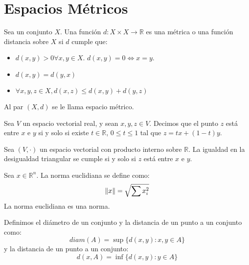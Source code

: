 \documentclass{./Topologia.tex}
\begin{document}
\chapter{Espacios Métricos}
\begin{defin}
Sea un conjunto $X$. Una función $d: X \times X \to \mathbb{R}$ es una métrica o una función distancia sobre $X$ si $d$ cumple que:
\begin{itemize}
	\item $d(x,y) > 0 \forall x,y \in X$. $d(x,y)=0 \iff x=y$.
	\item $d(x,y) = d(y,x)$
	\item $\forall x,y,z \in X, d(x,z) \leq d(x,y) + d(y,z)$ 
\end{itemize}
Al par $(X,d)$ se le llama espacio métrico. 
\end{defin}
\begin{defin} 
	Sea $V$ un espacio vectorial real, y sean $x, y, z \in V$. Decimos que el punto $z$ está entre $x$ e $y$ si y solo si existe $t \in \mathbb{R}$, $0 \leq t \leq 1$ tal que $z = tx +(1-t)y$.     

\end{defin}
\begin{prop}
Sea $(V, \cdot )$ un espacio vectorial con producto interno sobre $\mathbb{R}$. La igualdad en la desigualdad triangular se cumple si y solo si $z$ está entre $x$ e $y$.     
\end{prop}
\begin{prop}
	Sea $x \in \mathbb{R}^{n}$. La norma euclidiana se define como:
	\[
		\norm{x} = \sqrt{\sum x_{i}^{2}}
	\]
	La norma euclidiana es una norma.
\end{prop}
\begin{defin}
Definimos el diámetro de un conjunto y la distancia de un punto a un conjunto como:
\[
	diam(A) = \sup \{ d(x,y): x,y \in A \}
\]
y la distancia de un punto a un conjunto:
\[
	d(x,A) = \inf \{ d(x,y) : y \in A \}
\]
\end{defin}
\end{document}
